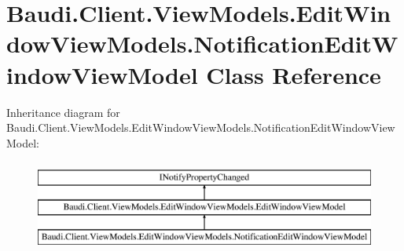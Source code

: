 \hypertarget{class_baudi_1_1_client_1_1_view_models_1_1_edit_window_view_models_1_1_notification_edit_window_view_model}{}\section{Baudi.\+Client.\+View\+Models.\+Edit\+Window\+View\+Models.\+Notification\+Edit\+Window\+View\+Model Class Reference}
\label{class_baudi_1_1_client_1_1_view_models_1_1_edit_window_view_models_1_1_notification_edit_window_view_model}
Inheritance diagram for Baudi.\+Client.\+View\+Models.\+Edit\+Window\+View\+Models.\+Notification\+Edit\+Window\+View\+Model\+:\begin{figure}[H]
\begin{center}
\leavevmode
\includegraphics[height=3.000000cm]{class_baudi_1_1_client_1_1_view_models_1_1_edit_window_view_models_1_1_notification_edit_window_view_model}
\end{center}
\end{figure}
